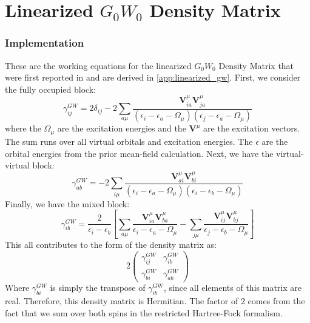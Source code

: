 \documentclass[12pt]{caltech_thesis}
\begin{document}
\chapter{Linearized $G_0W_0$ Density Matrix}
\subsection{Implementation}
These are the working equations for the linearized $G_0W_0$ Density Matrix that were first reported in \autocite{bruneval_assessment_2019} and are derived in \ref{app:linearized_gw}.  First, we consider the fully occupied block:
\begin{equation}
\gamma_{i j}^{G W}=2\delta_{i j}-2\sum_{a \mu} \frac{\textbf{V}_{i a}^\mu \textbf{V}_{ja}^\mu}{\left(\epsilon_{i}-\epsilon_{a}-\Omega_{\mu}\right)\left(\epsilon_{j}-\epsilon_{a}-\Omega_{\mu}\right)}
\end{equation}
where the $\Omega_{\mu}$ are the excitation energies and the $\textbf{V}^{\mu}$ are the excitation vectors. The sum runs over all virtual orbitals and excitation energies. The $\epsilon$ are the orbital energies from the prior mean-field calculation. Next, we have the virtual-virtual block:
\begin{equation}
\gamma_{a b}^{G W}=-2\sum_{i \mu } \frac{\textbf{V}_{a i}^{\mu} \textbf{V}_{b i}^{\mu}}{\left(\epsilon_{i}-\epsilon_{a}-\Omega_{\mu}\right)\left(\epsilon_{i}-\epsilon_{b}-\Omega_{\mu}\right)}
\end{equation}
Finally, we have the mixed block:
\begin{equation}
    \gamma_{i b}^{G W}=\frac{2}{\epsilon_{i}-\epsilon_{b}}\left[ \sum_{a \mu} \frac{\textbf{V}_{i a}^{\mu} \textbf{V}_{b a}^{\mu}}{\epsilon_{i}-\epsilon_{a}-\Omega_{\mu}} - \sum_{j \mu} \frac{\textbf{V}_{i j}^{\mu} \textbf{V}_{bj}^{\mu}}{\epsilon_{j}-\epsilon_{b}-\Omega_{\mu}} \right]
\end{equation}
This all contributes to the form of the density matrix as:
\begin{equation}
    2\begin{pmatrix}
        \gamma _{i j}^{G W} & \gamma _{i b}^{G W} \\
        \gamma _{bi}^{G W } & \gamma _{a b}^{G W}
    \end{pmatrix}
\end{equation}
Where $\gamma _{bi}^{G W }$ is simply the transpose of $\gamma _{ib}^{\text{GW}}$, since all elements of this matrix are real. Therefore, this density matrix is Hermitian. The factor of 2 comes from the fact that we sum over both spins in the restricted Hartree-Fock formalism.
\newpage
\end{document}
